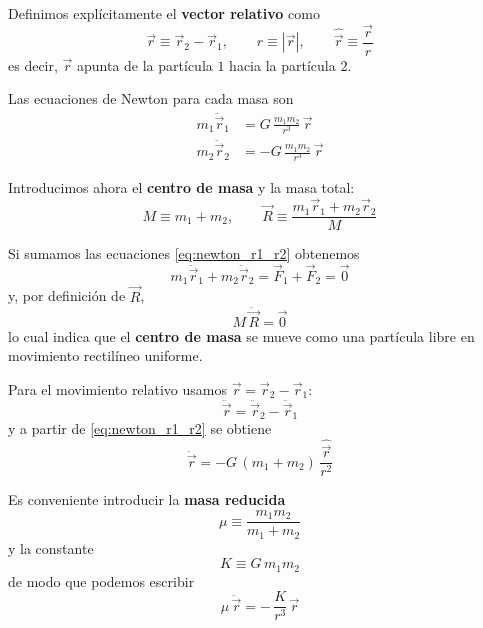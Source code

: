 \documentclass{article}
\begin{document}
Definimos explícitamente el \textcolor{Lochinvar}{\textbf{vector relativo}} como
\begin{equation}
\boxed{
\vec r \equiv \vec r_{2} - \vec r_{1},
\qquad
r \equiv |\vec r|,
\qquad
\hat{\vec r} \equiv \frac{\vec r}{r}
}
\label{eq:def_vector_relativo}
\end{equation}
es decir, \(\vec r\) apunta de la partícula \(1\) hacia la partícula \(2\).

Las ecuaciones de Newton para cada masa son
\begin{equation}
\begin{split}
m_{1}\ddot{\vec r}_{1}
&= G\,\frac{m_{1}m_{2}}{r^{3}}\,\vec r \\[4pt]
m_{2}\ddot{\vec r}_{2}
&= -G\,\frac{m_{1}m_{2}}{r^{3}}\,\vec r
\end{split}\label{eq:newton_r1_r2}
\end{equation}

\vspace{0.4cm}


Introducimos ahora el \textcolor{Apple Green}{\textbf{centro de masa}} y la masa total:
\begin{equation}
M \equiv m_{1}+m_{2},
\qquad
\vec R \equiv \frac{m_{1}\vec r_{1} + m_{2}\vec r_{2}}{M}
\label{eq:def_R_CM}
\end{equation}

Si sumamos las ecuaciones \eqref{eq:newton_r1_r2} obtenemos
\[
m_{1}\ddot{\vec r}_{1} + m_{2}\ddot{\vec r}_{2}
= \vec F_{1} + \vec F_{2} = \vec 0
\]
y, por definición de \(\vec R\),
\begin{equation}
\boxed{
M\,\ddot{\vec R} = \vec 0
}
\label{eq:CM_libre}
\end{equation}
lo cual indica que el \textcolor{vividviolet}{\textbf{centro de masa}} se mueve como una partícula libre
en movimiento rectilíneo uniforme.

Para el movimiento relativo usamos \(\vec r = \vec r_{2} - \vec r_{1}\):
\[
\ddot{\vec r} = \ddot{\vec r}_{2} - \ddot{\vec r}_{1}
\]
y a partir de \eqref{eq:newton_r1_r2} se obtiene
\begin{equation}
\boxed{
\ddot{\vec r}
= -G\,(m_{1}+m_{2})\,\frac{\hat{\vec r}}{r^{2}}
}
\label{eq:ecuacion_relativa_GM}
\end{equation}

Es conveniente introducir la \textcolor{orange(colorwheel)}{\textbf{masa reducida}}
\begin{equation}
\boxed{
\mu \equiv \frac{m_{1}m_{2}}{m_{1}+m_{2}}
}
\label{eq:def_masa_reducida}
\end{equation}
y la constante
\begin{equation}
K \equiv G\,m_{1}m_{2}
\label{eq:def_K_Kepler}
\end{equation}
de modo que podemos escribir
\begin{equation}
\boxed{
\mu\,\ddot{\vec r}
= -\,\frac{K}{r^{3}}\,\vec r
}
\label{eq:ecuacion_relativa_mu}
\end{equation}
\end{document}
